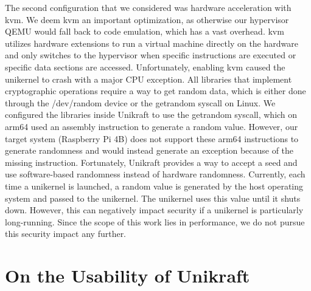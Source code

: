 \documentclass[public,noindent]{aisecreport}
\begin{document}
The second configuration that we considered was hardware acceleration with kvm. We deem kvm an important optimization, as otherwise our hypervisor QEMU would fall back to code emulation, which has a vast overhead. kvm utilizes hardware extensions to run a virtual machine directly on the hardware and only switches to the hypervisor when specific instructions are executed or specific data sections are accessed. Unfortunately, enabling kvm caused the unikernel to crash with a major CPU exception. All libraries that implement cryptographic operations require a way to get random data, which is either done through the /dev/random device or the getrandom syscall on Linux. We configured the libraries inside Unikraft to use the getrandom syscall, which on arm64 used an assembly instruction to generate a random value. However, our target system (Raspberry Pi 4B) does not support these arm64 instructions to generate randomness and would instead generate an exception because of the missing instruction. Fortunately, Unikraft provides a way to accept a seed and use software-based randomness instead of hardware randomness. Currently, each time a unikernel is launched, a random value is generated by the host operating system and passed to the unikernel. The unikernel uses this value until it shuts down. However, this can negatively impact security if a unikernel is particularly long-running. Since the scope of this work lies in performance, we do not pursue this security impact any further. 

\section{On the Usability of Unikraft}
\end{document}
